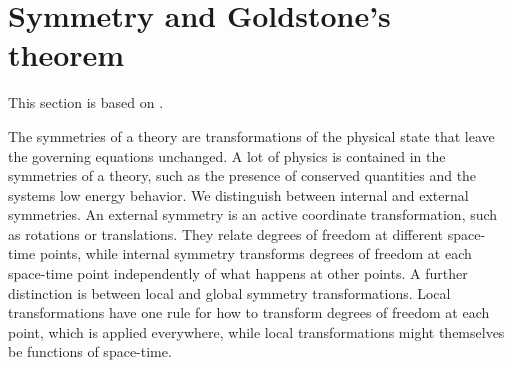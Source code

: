 \section{Symmetry and Goldstone's theorem}
This section is based on \cite{Peskin:IntroQFT,weinberg_1995,weinberg_1996_vol2,smooth_manifolds}.

The symmetries of a theory are transformations of the physical state that leave the governing equations unchanged.
A lot of physics is contained in the symmetries of a theory, such as the presence of conserved quantities and the systems low energy behavior.
We distinguish between internal and external symmetries.
An external symmetry is an active coordinate transformation, such as rotations or translations.
They relate degrees of freedom at different space-time points, while internal symmetry transforms degrees of freedom at each space-time point independently of what happens at other points.
A further distinction is between local and global symmetry transformations.
Local transformations have one rule for how to transform degrees of freedom at each point, which is applied everywhere, while local transformations might themselves be functions of space-time.

